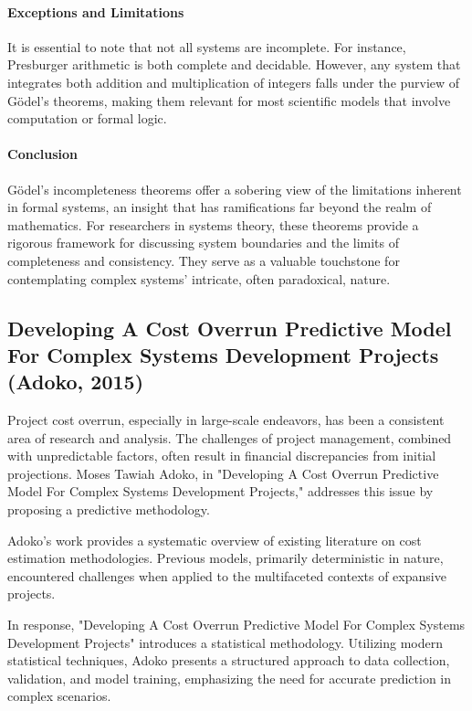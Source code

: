 \documentclass[sn-nature]{sn-jnl}%
\theoremstyle{thmstyleone}%
\theoremstyle{thmstyletwo}%
\theoremstyle{thmstylethree}%
\begin{document}
\paragraph{Exceptions and Limitations}
It is essential to note that not all systems are incomplete. For instance, Presburger arithmetic is both complete and decidable. However, any system that integrates both addition and multiplication of integers falls under the purview of Gödel's theorems, making them relevant for most scientific models that involve computation or formal logic.

\paragraph{Conclusion}
Gödel's incompleteness theorems offer a sobering view of the limitations inherent in formal systems, an insight that has ramifications far beyond the realm of mathematics. For researchers in systems theory, these theorems provide a rigorous framework for discussing system boundaries and the limits of completeness and consistency. They serve as a valuable touchstone for contemplating complex systems' intricate, often paradoxical, nature.

\subsection{Developing A Cost Overrun Predictive Model For Complex Systems Development Projects (Adoko, 2015)\cite{adoko_developing_2015}}

Project cost overrun, especially in large-scale endeavors, has been a consistent area of research and analysis. The challenges of project management, combined with unpredictable factors, often result in financial discrepancies from initial projections. Moses Tawiah Adoko, in "Developing A Cost Overrun Predictive Model For Complex Systems Development Projects," addresses this issue by proposing a predictive methodology.

Adoko's work provides a systematic overview of existing literature on cost estimation methodologies. Previous models, primarily deterministic in nature, encountered challenges when applied to the multifaceted contexts of expansive projects.

In response, "Developing A Cost Overrun Predictive Model For Complex Systems Development Projects" introduces a statistical methodology. Utilizing modern statistical techniques, Adoko presents a structured approach to data collection, validation, and model training, emphasizing the need for accurate prediction in complex scenarios.
\end{document}
